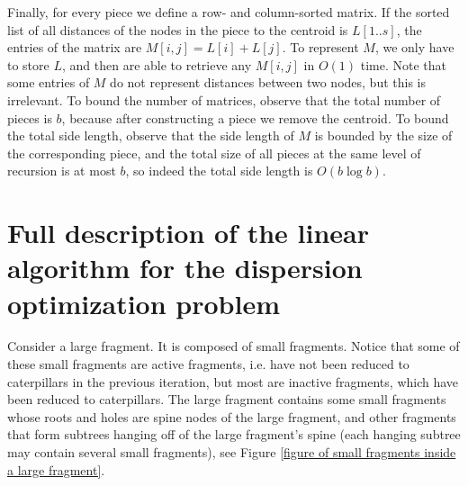 \documentclass[a4paper,UKenglish]{lipics-v2016}
\theoremstyle{plain}
\begin{document}
Finally, for every piece we define a row- and column-sorted matrix. If the sorted list of all distances of the nodes in the piece to the
centroid is $L[1..s]$, the entries of the matrix are $M[i,j]=L[i]+L[j]$. To represent $M$, we only have to store $L$, and then are able to
retrieve any $M[i,j]$ in $O(1)$ time. Note that some entries of $M$ do not represent distances between two nodes, but this is irrelevant.
To bound the number of matrices, observe that the total number of pieces is $b$, because after constructing a piece we remove the centroid.
To bound the total side length, observe that the side length of $M$ is bounded by the size of the corresponding piece, and the total size
of all pieces at the same level of recursion is at most $b$, so indeed the total side length is $O(b\log b)$.

\section{Full description of the linear algorithm for the dispersion optimization problem}\label{appendix linear algorithm for the dispersion optimization problem}

Consider a large fragment. It is composed of small fragments. Notice that some of these small fragments are active fragments, i.e. have not been reduced to caterpillars in the previous iteration, but most are inactive fragments, which have
been reduced to caterpillars. The large fragment contains some small fragments whose roots and holes are spine nodes of the large fragment,
and other fragments that form subtrees hanging off of the large fragment's spine (each hanging subtree may
contain several small fragments), see Figure \ref{figure of small fragments inside a large fragment}.
\end{document}
